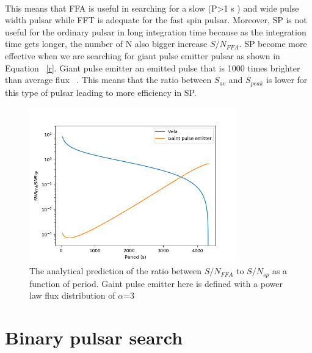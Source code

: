 \documentclass[thesis_msc.tex]{subfiles}
\begin{document}
  \paragraph{} This means that FFA is useful in searching for a slow (P>1 s ) and wide pulse width pulsar while FFT is adequate for the fast spin pulsar. Moreover, SP is not useful for the ordinary pulsar in long integration time because as the integration time gets longer, the number of N also bigger increase $S/N_{FFA}$. SP become more effective when we are searching for giant pulse emitter pulsar as shown in Equation ~\ref{r}.  Giant pulse emitter an emitted pulse that is 1000 times brighter than average flux    ~\cite{karuppusamy2010giant}.  This means that the ratio between   $S_{av}$ and $S_{peak}$ is lower for this type of pulsar leading to more efficiency in SP. 


  \begin{figure}[h] \centering
\includegraphics[width=0.80\textwidth]{figures/FFA-SP.png}
\caption{The analytical prediction of the ratio between $S/N_{FFA}$ to $S/N_{sp}$ as a function of period.  Gaint pulse emitter here is defined with a power law flux distribution of $\alpha$=3}
\label{FFA_SP_com}
\end{figure}
  
    \section{Binary pulsar search} \label{BS}
\end{document}
